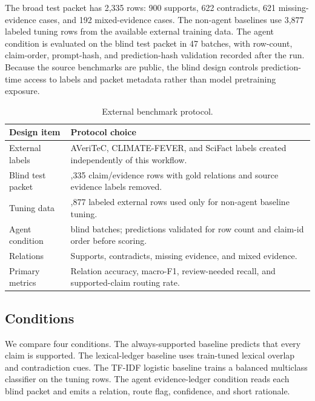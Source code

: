 \documentclass[11pt]{article}
\begin{document}
The broad test packet has 2,335 rows: 900 supports, 622 contradicts, 621 missing-evidence cases, and 192 mixed-evidence cases. The non-agent baselines use 3,877 labeled tuning rows from the available external training data. The agent condition is evaluated on the blind test packet in 47 batches, with row-count, claim-order, prompt-hash, and prediction-hash validation recorded after the run. Because the source benchmarks are public, the blind design controls prediction-time access to labels and packet metadata rather than model pretraining exposure.

\begin{table}[H]
\centering
\caption{External benchmark protocol.}
\label{tab:protocol}
\small
\begin{tabularx}{\textwidth}{>{\raggedright\arraybackslash}p{}>{\raggedright\arraybackslash}X}
\toprule
Design item & Protocol choice \\
\midrule
External labels & AVeriTeC, CLIMATE-FEVER, and SciFact labels created independently of this workflow. \\
Blind test packet & 2,335 claim/evidence rows with gold relations and source evidence labels removed. \\
Tuning data & 3,877 labeled external rows used only for non-agent baseline tuning. \\
Agent condition & 47 blind batches; predictions validated for row count and claim-id order before scoring. \\
Relations & Supports, contradicts, missing evidence, and mixed evidence. \\
Primary metrics & Relation accuracy, macro-F1, review-needed recall, and supported-claim routing rate. \\
\bottomrule
\end{tabularx}
\end{table}

\subsection{Conditions}

We compare four conditions. The always-supported baseline predicts that every claim is supported. The lexical-ledger baseline uses train-tuned lexical overlap and contradiction cues. The TF-IDF logistic baseline trains a balanced multiclass classifier on the tuning rows. The agent evidence-ledger condition reads each blind packet and emits a relation, route flag, confidence, and short rationale.
\end{document}
